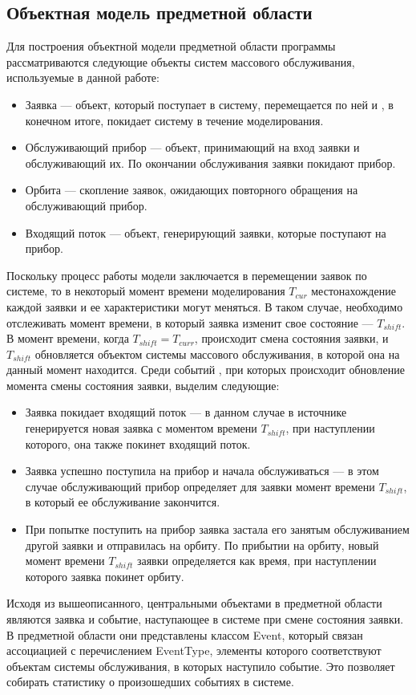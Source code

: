 \subsection {Объектная модель предметной области}
Для построения объектной модели предметной области программы рассматриваются следующие объекты систем массового обслуживания, используемые в данной работе:
\begin{itemize}
\item Заявка --- объект, который поступает в систему, перемещается по ней и , в конечном итоге, покидает систему в течение моделирования.
\item Обслуживающий прибор --- объект, принимающий на вход заявки и обслуживающий их. По окончании обслуживания заявки покидают прибор.
\item Орбита --- скопление заявок, ожидающих повторного обращения на обслуживающий прибор.
\item Входящий поток --- объект, генерирующий заявки, которые поступают на прибор.
	\end{itemize}
 Поскольку процесс работы модели заключается в перемещении заявок по системе, то в некоторый момент времени моделирования $T_{cur}$ местонахождение каждой заявки и ее характеристики могут меняться. В таком случае, необходимо отслеживать момент времени, в который заявка изменит свое состояние --- $T_{shift}$. В момент времени, когда $T_{shift} = T_{curr}$,  происходит смена состояния заявки, и  $T_{shift}$ обновляется объектом системы массового обслуживания, в которой она на данный момент находится. Среди событий , при которых происходит обновление момента смены состояния заявки, выделим следующие:
\begin{itemize}
	\item Заявка покидает входящий поток --- в данном случае в источнике генерируется новая заявка с моментом времени $T_{shift}$, при наступлении которого, она также покинет входящий поток.
	\item Заявка успешно поступила на прибор и начала обслуживаться --- в этом случае обслуживающий прибор определяет для заявки момент времени $T_{shift}$, в который ее обслуживание закончится.
	\item При попытке поступить на прибор заявка застала его занятым обслуживанием другой заявки и отправилась на орбиту. По прибытии на орбиту, новый момент времени $T_{shift}$ заявки определяется как время, при наступлении которого заявка покинет орбиту.
\end{itemize}
Исходя из вышеописанного, центральными объектами в предметной области являются заявка и событие, наступающее в системе при смене состояния заявки. В предметной области они представлены классом Event, который связан ассоциацией с перечислением EventType, элементы которого соответствуют объектам системы обслуживания, в которых наступило  событие. Это позволяет собирать статистику о произошедших событиях в системе.
